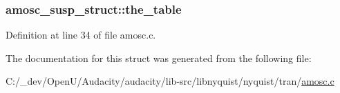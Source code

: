 \subsubsection[{\texorpdfstring{the\+\_\+table}{the_table}}]{ amosc\+\_\+susp\+\_\+struct\+::the\+\_\+table}\hypertarget{structamosc__susp__struct_ae267d43e76ae0ec2f4e188e91e218c73}{}\label{structamosc__susp__struct_ae267d43e76ae0ec2f4e188e91e218c73}


Definition at line 34 of file amosc.\+c.



The documentation for this struct was generated from the following file\+:\begin{DoxyCompactItemize}
\item 
C\+:/\+\_\+dev/\+Open\+U/\+Audacity/audacity/lib-\/src/libnyquist/nyquist/tran/\hyperlink{amosc_8c}{amosc.\+c}\end{DoxyCompactItemize}
